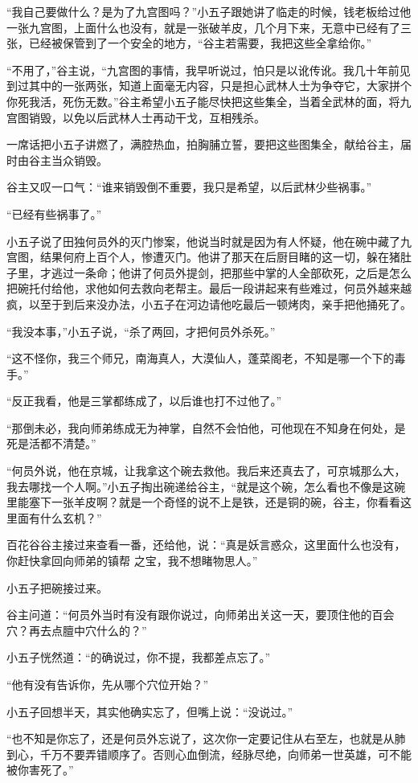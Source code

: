 “我自己要做什么？是为了九宫图吗？”小五子跟她讲了临走的时候，钱老板给过他一张九宫图，上面什么也没有，就是一张破羊皮，几个月下来，无意中已经有了三张，已经被保管到了一个安全的地方，“谷主若需要，我把这些全拿给你。”

“不用了，”谷主说，“九宫图的事情，我早听说过，怕只是以讹传讹。我几十年前见到过其中的一张两张，知道上面毫无内容，只是担心武林人士为争夺它，大家拼个你死我活，死伤无数。”谷主希望小五子能尽快把这些集全，当着全武林的面，将九宫图销毁，以免以后武林人士再动干戈，互相残杀。

一席话把小五子讲燃了，满腔热血，拍胸脯立誓，要把这些图集全，献给谷主，届时由谷主当众销毁。

谷主又叹一口气：“谁来销毁倒不重要，我只是希望，以后武林少些祸事。”

“已经有些祸事了。”

小五子说了田独何员外的灭门惨案，他说当时就是因为有人怀疑，他在碗中藏了九宫图，结果何府上百个人，惨遭灭门。他讲了那天在后厨目睹的这一切，躲在猪肚子里，才逃过一条命；他讲了何员外提剑，把那些中掌的人全部砍死，之后是怎么把碗托付给他，求他如何去救向老帮主。最后一段讲起来有些难过，何员外越来越疯，以至于到后来没办法，小五子在河边请他吃最后一顿烤肉，亲手把他捅死了。

“我没本事，”小五子说，“杀了两回，才把何员外杀死。”

“这不怪你，我三个师兄，南海真人，大漠仙人，蓬菜阁老，不知是哪一个下的毒手。”

“反正我看，他是三掌都练成了，以后谁也打不过他了。”

“那倒未必，我向师弟练成无为神掌，自然不会怕他，可他现在不知身在何处，是死是活都不清楚。”

“何员外说，他在京城，让我拿这个碗去救他。我后来还真去了，可京城那么大，我去哪找一个人啊。”小五子掏出碗递给谷主，“就是这个碗，怎么看也不像是这碗里能塞下一张羊皮啊？就是一个奇怪的说不上是铁，还是铜的碗，谷主，你看看这里面有什么玄机？”

百花谷谷主接过来查看一番，还给他，说：“真是妖言惑众，这里面什么也没有，你赶快拿回向师弟的镇帮
之宝，我不想睹物思人。”

小五子把碗接过来。

谷主问道：“何员外当时有没有跟你说过，向师弟出关这一天，要顶住他的百会穴？再去点膻中穴什么的？”

小五子恍然道：“的确说过，你不提，我都差点忘了。”

“他有没有告诉你，先从哪个穴位开始？”

小五子回想半天，其实他确实忘了，但嘴上说：“没说过。”

“也不知是你忘了，还是何员外忘说了，这次你一定要记住从右至左，也就是从肺到心，千万不要弄错顺序了。否则心血倒流，经脉尽绝，向师弟一世英雄，可不能被你害死了。”

